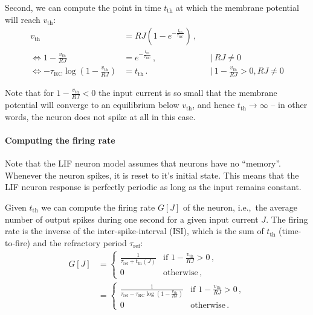 \documentclass[10pt,letterpaper,oneside]{article}
\begin{document}
Second, we can compute the point in time $t_\mathrm{th}$ at which the membrane potential will reach $v_\mathrm{th}$:
\begin{align*}
	v_\mathrm{th} &= RJ \left(1 - e^{-\frac{t_\mathrm{th}}{\tau_\mathrm{RC}}} \right) \,, \\
	\Leftrightarrow 1 - \frac{v_\mathrm{th}}{RJ} &= e^{-\frac{t_\mathrm{th}}{\tau_\mathrm{RC}}} \,, && \Big| \, RJ \neq 0 \\
	\Leftrightarrow - \tau_\mathrm{RC} \log \left( 1 - \frac{v_\mathrm{th}}{RJ} \right) &= t_\mathrm{th} \,.  && \Big| \, 1 - \frac{v_\mathrm{th}}{RJ} > 0 , RJ \neq 0
\end{align*}


Note that for $1 - \frac{v_\mathrm{th}}{RJ} < 0$ the input current is so small that the membrane potential will converge to an equilibrium below $v_\mathrm{th}$, and hence $t_\mathrm{th} \to \infty$ -- in other words, the neuron does not spike at all in this case.

\paragraph{Computing the firing rate}

Note that the LIF neuron model assumes that neurons have no \enquote{memory}. Whenever the neuron spikes, it is reset to it's initial state. This means that the LIF neuron response is perfectly periodic as long as the input remains constant.


Given $t_\mathrm{th}$ we can compute the firing rate $G[J]$ of the neuron, i.e.,~the average number of output spikes during one second for a given input current $J$. The firing rate is the inverse of the inter-spike-interval (ISI), which is the sum of $t_\mathrm{th}$ (time-to-fire) and the refractory period $\tau_\mathrm{ref}$:
\begin{align*}
	G[J]
		&= \begin{cases}
			\frac{1}{\tau_\mathrm{ref} + t_\mathrm{th}(J)} & \text{if } 1 - \frac{v_\mathrm{th}}{RJ} > 0 \,,\\
			0 & \mathrm{otherwise} \,,
		\end{cases} \\
		&= \begin{cases}
			\frac{1}{\tau_\mathrm{ref} - \tau_\mathrm{RC} \log \left( 1 - \frac{v_\mathrm{th}}{RJ} \right)} & \text{if } 1 - \frac{v_\mathrm{th}}{RJ} > 0 \,,\\
			0 & \mathrm{otherwise} \,.
		\end{cases}
\end{align*}
\end{document}
